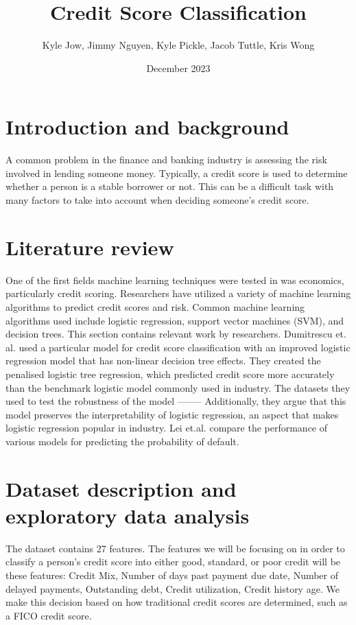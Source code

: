 \documentclass{article}
\title{\textbf{Credit Score Classification}}
\author{Kyle Jow, Jimmy Nguyen, Kyle Pickle, Jacob Tuttle, Kris Wong}
\date{December 2023}
\begin{document}
\maketitle
\newpage
{}
\pagestyle{fancy}
\fancyhf{} %
\fancyfoot[R]{\thepage}
\section*{Introduction and background}
A common problem in the finance and banking industry is assessing the risk
involved in lending someone money. Typically, a credit score is used to determine
whether a person is a stable borrower or not. This can be a difficult task with
many factors to take into account when deciding someone's credit score.
\newpage
\section*{Literature review}
One of the first fields machine learning techniques were tested in was economics,
particularly credit scoring. Researchers have utilized a variety of machine learning
algorithms to predict credit scores and risk. Common machine learning algorithms
used include logistic regression, support vector machines (SVM), and decision trees.
This section contains relevant work by researchers.
\vspace{5mm}\newline
Dumitrescu et. al. used a particular model for credit score classification with an 
improved logistic regression model that has non-linear decision tree effects. They created 
the penalised logistic tree regression, which predicted credit score 
more accurately than the benchmark logistic model commonly used in industry. The
datasets they used to test the robustness of the model --------
Additionally, they argue that this model preserves the interpretability of 
logistic regression, an aspect that makes logistic regression popular in industry. 
Lei et.al. compare the performance of various models for predicting the probability 
of default. 

\newpage
\section*{Dataset description and exploratory data analysis}
The dataset contains 27 features. The features we will be focusing on in order
to classify a person's credit score into either good, standard, or poor credit
will be these features: Credit Mix, Number of days past payment due date, Number
of delayed payments, Outstanding debt, Credit utilization, Credit history age.
We make this decision based on how traditional credit scores are determined,
such as a FICO credit score.
\newpage
\end{document}
